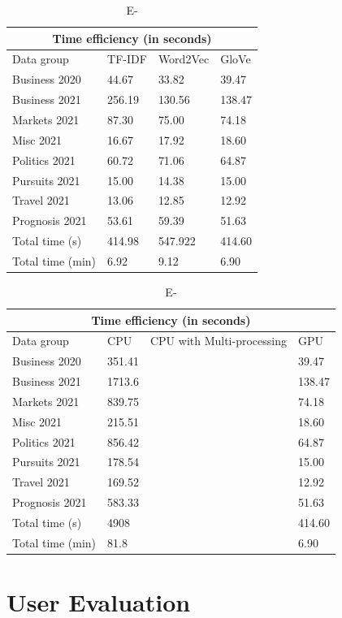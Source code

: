 \begin{table}[H]
\centering
\renewcommand{\arraystretch}{1.05}
\begin{tabularx}{0.9\textwidth}{X X X X} 
\multicolumn{4}{c}{Time efficiency (in seconds)} \\
 \hline
 Data group & TF-IDF & Word2Vec & GloVe \\
 \hline
 Business 2020 & 44.67& 33.82& 39.47 \\ 
 Business 2021 & 256.19 & 130.56 & 138.47 \\
 Markets 2021 & 87.30 & 75.00 & 74.18 \\
 Misc 2021 & 16.67 & 17.92 & 18.60 \\
 Politics 2021 & 60.72 & 71.06 & 64.87 \\
 Pursuits 2021 & 15.00 & 14.38 & 15.00 \\ 
 Travel 2021 & 13.06 & 12.85 & 12.92 \\
 Prognosis 2021 & 53.61 & 59.39 & 51.63 \\ 
 \hline
 Total time (s) & 414.98 & 547.922 & 414.60 \\ 
  Total time (min) & 6.92 & 9.12 & 6.90 \\ 
\end{tabularx}
\caption{E-}
\label{table:word_embed}
\end{table}


\begin{table}[H]
\centering
\renewcommand{\arraystretch}{1.05}
\begin{tabularx}{0.8\textwidth}{X X X X} 
\multicolumn{4}{c}{Time efficiency (in seconds)} \\
 \hline
 Data group & CPU & CPU with Multi-processing & GPU \\
 \hline
 Business 2020 & 351.41 & & 39.47 \\ 
 Business 2021 & 1713.6 & & 138.47 \\
 Markets 2021 & 839.75  & & 74.18\\
 Misc 2021 & 215.51 & & 18.60 \\
 Politics 2021 & 856.42  & & 64.87 \\
 Pursuits 2021 & 178.54 & & 15.00 \\ 
 Travel 2021 & 169.52 & & 12.92 \\
 Prognosis 2021 & 583.33  & & 51.63 \\ 
 \hline
 Total time (s) & 4908 & & 414.60 \\ 
 Total time (min) & 81.8  & & 6.90\\ 
\end{tabularx}

\caption{E-}
\label{table:word_embed}
\end{table}

\section{User Evaluation} \label{s:user_eval}






